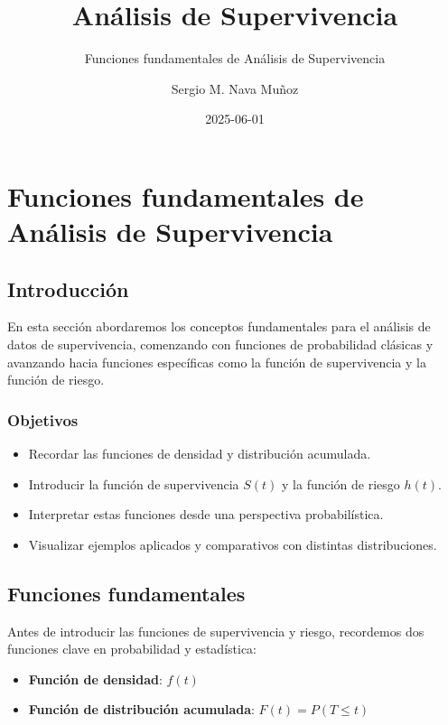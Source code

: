 \documentclass[
  letterpaper,
  ignorenonframetext,
  DIV=11,
  numbers=noendperiod]{scrartcl}
\title{Análisis de Supervivencia}
\subtitle{Funciones fundamentales de Análisis de Supervivencia}
\author{Sergio M. Nava Muñoz}
\date{2025-06-01}
\providecommand{\tightlist}{%
  \setlength{\itemsep}{0pt}\setlength{\parskip}{0pt}}\usepackage{longtable,booktabs,array}
\begin{document}
\frame{\titlepage}


\section{Funciones fundamentales de Análisis de
Supervivencia}\label{funciones-fundamentales-de-anuxe1lisis-de-supervivencia}

\subsection{Introducción}\label{introducciuxf3n}

En esta sección abordaremos los conceptos fundamentales para el análisis
de datos de supervivencia, comenzando con funciones de probabilidad
clásicas y avanzando hacia funciones específicas como la función de
supervivencia y la función de riesgo.

\subsubsection{Objetivos}\label{objetivos}

\begin{itemize}
\tightlist
\item
  Recordar las funciones de densidad y distribución acumulada.
\item
  Introducir la función de supervivencia \(S(t)\) y la función de riesgo
  \(h(t)\).
\item
  Interpretar estas funciones desde una perspectiva probabilística.
\item
  Visualizar ejemplos aplicados y comparativos con distintas
  distribuciones.
\end{itemize}

\subsection{Funciones fundamentales}\label{funciones-fundamentales}

Antes de introducir las funciones de supervivencia y riesgo, recordemos
dos funciones clave en probabilidad y estadística:

\begin{itemize}
\tightlist
\item
  \textbf{Función de densidad}: \(f(t)\)
\item
  \textbf{Función de distribución acumulada}: \(F(t) = P(T \leq t)\)
\end{itemize}
\end{document}
